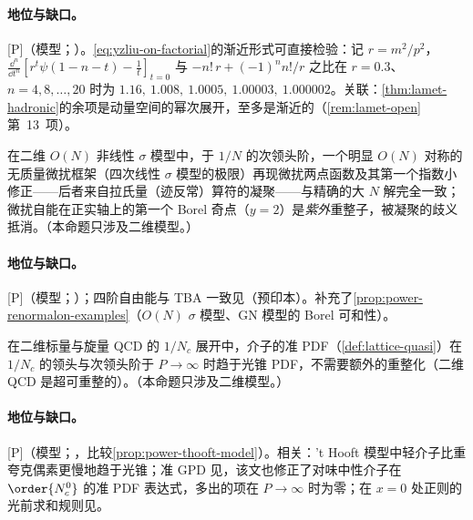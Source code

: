 \paragraph{地位与缺口。}[P]（模型；\cite[第~1、4~节]{Liu:2025edu}）。\cref{eq:yzliu-on-factorial}的渐近形式可直接检验：记 $r=m^2/p^2$，$\frac{\dd^n}{\dd t^n}[r^t\psi(1-n-t)-\frac1t]_{t=0}$ 与 $-n!\,r+(-1)^nn!/r$ 之比在 $r=0.3$、$n=4,8,\dots,20$ 时为 $1.16,\ 1.008,\ 1.0005,\ 1.00003,\ 1.000002$。关联：\cref{thm:lamet-hadronic}的余项是动量空间的幂次展开，至多是渐近的（\cref{rem:lamet-open}第~13~项）。

\begin{proposition}\label{prop:yzliu-nlsm}
在二维 $O(N)$ 非线性 $\sigma$ 模型中，于 $1/N$ 的次领头阶，一个明显 $O(N)$ 对称的无质量微扰框架（四次线性 $\sigma$ 模型的极限）再现微扰两点函数及其第一个指数小修正——后者来自拉氏量（迹反常）算符的凝聚——与精确的大 $N$ 解完全一致；微扰自能在正实轴上的第一个 Borel 奇点（$y=2$）是\emph{紫外}重整子，被凝聚的歧义抵消。（本命题只涉及二维模型。）
\end{proposition}

\paragraph{地位与缺口。}[P]（模型；\cite[第~1、5~节]{Liu:2025bqq}）；四阶自由能与 TBA 一致见\cite{Liu:2026npv}（预印本）。补充了\cref{prop:power-renormalon-examples}（$O(N)$ $\sigma$ 模型、GN 模型的 Borel 可和性）。

\begin{proposition}\label{prop:yzliu-2dqcd}
在二维标量与旋量 QCD 的 $1/N_c$ 展开中，介子的准 PDF（\cref{def:lattice-quasi}）在 $1/N_c$ 的领头与次领头阶于 $P\to\infty$ 时趋于光锥 PDF，不需要额外的重整化（二维 QCD 是超可重整的）。（本命题只涉及二维模型。）
\end{proposition}

\paragraph{地位与缺口。}[P]（模型；\cite{Ji:2018waw}，比较\cref{prop:power-thooft-model}）。相关：'t Hooft 模型中轻介子比重夸克偶素更慢地趋于光锥\cite{Jia:2018qee}；准 GPD 见\cite{Jia:2024atq}，该文也修正了\cite{Jia:2018qee}对味中性介子在 $\order{N_c^0}$ 的准 PDF 表达式，多出的项在 $P\to\infty$ 时为零；在 $x=0$ 处正则的光前求和规则见\cite{Ji:2020bby}。


